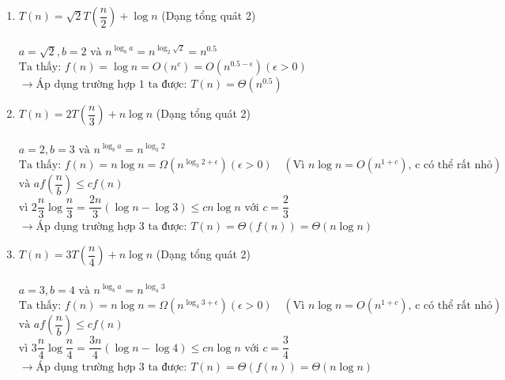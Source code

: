 \documentclass[12pt, letterpaper]{article}
\begin{document}
\begin{enumerate}[label=\bfseries\large\theenumi.]
    \item $ T(n) = \sqrt{2} T\left( \dfrac{n}{2} \right) + \log n $ (Dạng tổng quát 2) \\ \\
        $ a = \sqrt{2}, b = 2 \text{ và } n^{\log_b a} = n^{\log_2 \sqrt{2}} = n^{0.5} $ \\
        $ \text{Ta thấy: } f(n) = \log n = O(n^c) = O(n^{0.5 - \epsilon}) (\epsilon > 0) $ \\
        $ \rightarrow \text{Áp dụng trường hợp 1 ta được: } T(n) = \Theta(n^{0.5}) $

    \item $ T(n) = 2T\left( \dfrac{n}{3} \right) + n \log n $ (Dạng tổng quát 2) \\ \\
        $ a = 2, b = 3 \text{ và } n^{\log_b a} = n^{\log_3 2} $ \\
        $ \text{Ta thấy: } f(n) = n \log n = \Omega(n^{\log_3 2 + \epsilon}) (\epsilon > 0) \quad (\text{Vì } n \log n = O(n^{1+c}) \text{, c có thể rất nhỏ})$ \\
        $ \text{và } af\left(\dfrac{n}{b}\right) \leq cf(n) $ \\
        $ \text{vì } 2\dfrac{n}{3} \log \dfrac{n}{3} = \dfrac{2n}{3}(\log n - \log 3) \leq c n \log n \text{ với } c = \dfrac{2}{3} $ \\
        $ \rightarrow \text{Áp dụng trường hợp 3 ta được: } T(n) = \Theta(f(n)) = \Theta(n \log n) $

    \item $ T(n) = 3T\left( \dfrac{n}{4} \right) + n \log n $ (Dạng tổng quát 2) \\ \\
        $ a = 3, b = 4 \text{ và } n^{\log_b a} = n^{\log_4 3} $ \\
        $ \text{Ta thấy: } f(n) = n \log n = \Omega(n^{\log_4 3 + \epsilon}) (\epsilon > 0) \quad (\text{Vì } n \log n = O(n^{1+c}) \text{, c có thể rất nhỏ})$ \\
        $ \text{và } af\left(\dfrac{n}{b}\right) \leq cf(n) $ \\
        $ \text{vì } 3\dfrac{n}{4} \log \dfrac{n}{4} = \dfrac{3n}{4}(\log n - \log 4) \leq c n \log n \text{ với } c = \dfrac{3}{4} $ \\
        $ \rightarrow \text{Áp dụng trường hợp 3 ta được: } T(n) = \Theta(f(n)) = \Theta(n \log n) $


\end{enumerate}
\end{document}
